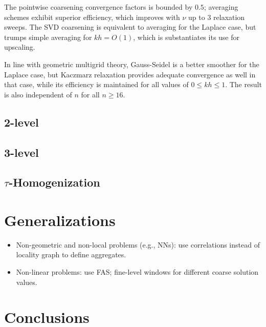 \documentclass{article}
\begin{document}

The pointwise coarsening convergence factors is bounded by $0.5$; averaging schemes exhibit superior efficiency, which improves with $\nu$ up to $3$ relaxation sweeps. The SVD coarsening is equivalent to averaging for the Laplace case, but trumps simple averaging for $kh = O(1)$, which is substantiates its use for upscaling.

In line with geometric multigrid theory, Gauss-Seidel is a better smoother for the Laplace case, but Kaczmarz relaxation provides adequate convergence as well in that case, while its efficiency is maintained for all values of $0 \leq kh \leq 1$. The result is also independent of $n$ for all $n \geq 16$.

\subsection{2-level}

\subsection{3-level}

\subsection{$\tau$-Homogenization}

\section{Generalizations}
\begin{itemize}
	\item Non-geometric and non-local problems (e.g., NNs): use correlations instead of locality graph to define aggregates.
	\item Non-linear problems: use FAS; fine-level windows for different coarse solution values.
\end{itemize}

\section{Conclusions}
\end{document}
